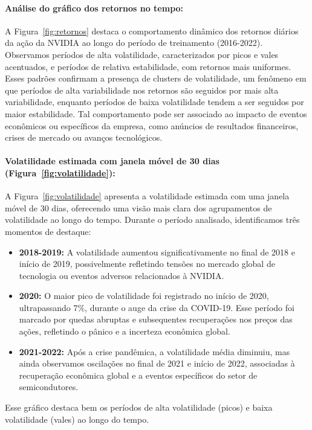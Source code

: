 \documentclass[a4paper, 12pt]{article}
\begin{document}
\paragraph{Análise do gráfico dos retornos no tempo:} 
A Figura~\ref{fig:retornos} destaca o comportamento dinâmico dos retornos diários da ação da NVIDIA ao longo do período de treinamento (2016-2022). Observamos períodos de alta volatilidade, caracterizados por picos e vales acentuados, e períodos de relativa estabilidade, com retornos mais uniformes. Esses padrões confirmam a presença de clusters de volatilidade, um fenômeno em que períodos de alta variabilidade nos retornos são seguidos por mais alta variabilidade, enquanto períodos de baixa volatilidade tendem a ser seguidos por maior estabilidade. Tal comportamento pode ser associado ao impacto de eventos econômicos ou específicos da empresa, como anúncios de resultados financeiros, crises de mercado ou avanços tecnológicos.

\paragraph{Volatilidade estimada com janela móvel de 30 dias (Figura~\ref{fig:volatilidade}):} 
A Figura~\ref{fig:volatilidade} apresenta a volatilidade estimada com uma janela móvel de 30 dias, oferecendo uma visão mais clara dos agrupamentos de volatilidade ao longo do tempo. Durante o período analisado, identificamos três momentos de destaque:
\begin{itemize}
    \item \textbf{2018-2019:} A volatilidade aumentou significativamente no final de 2018 e início de 2019, possivelmente refletindo tensões no mercado global de tecnologia ou eventos adversos relacionados à NVIDIA.
    \item \textbf{2020:} O maior pico de volatilidade foi registrado no início de 2020, ultrapassando 7\%, durante o auge da crise da COVID-19. Esse período foi marcado por quedas abruptas e subsequentes recuperações nos preços das ações, refletindo o pânico e a incerteza econômica global.
    \item \textbf{2021-2022:} Após a crise pandêmica, a volatilidade média diminuiu, mas ainda observamos oscilações no final de 2021 e início de 2022, associadas à recuperação econômica global e a eventos específicos do setor de semicondutores.
\end{itemize}

Esse gráfico destaca bem os períodos de alta volatilidade (picos) e baixa volatilidade (vales) ao longo do tempo.
\end{document}

